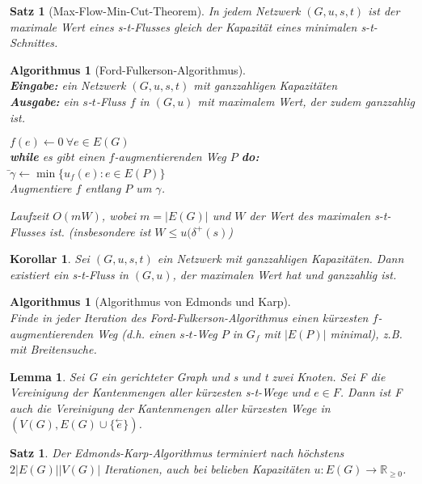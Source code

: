 \documentclass[12pt,a4paper]{article}
\theoremstyle{plain}
\newtheorem{Satz}[Theorem]{Satz}
\newtheorem{Lemma}[Theorem]{Lemma}
\newtheorem{Korollar}[Theorem]{Korollar}
\newtheorem{Algorithmus}[Theorem]{Algorithmus}
\newcommand{\R}{\mathbb{R}}
\numberwithin{equation}{section}
\begin{document}
\begin{Satz}[Max-Flow-Min-Cut-Theorem]
In jedem Netzwerk $(G,u,s,t)$ ist der maximale Wert eines s-t-Flusses gleich der Kapazität eines minimalen s-t-Schnittes.
\end{Satz}
\begin{Algorithmus}[Ford-Fulkerson-Algorithmus]\\
\textbf{Eingabe:} ein Netzwerk $(G,u,s,t)$ mit ganzzahligen Kapazitäten\\
\textbf{Ausgabe:} ein $s$-$t$-Fluss $f$ in $(G,u)$ mit maximalem Wert, der zudem ganzzahlig ist.
\begin{tabbing}
$f(e)\leftarrow 0\ \forall e\in E(G)$\\
\textbf{while} es gibt einen $f$-augmentierenden Weg $P$ \textbf{do:}\\
\text{\qquad}\=$\gamma\leftarrow \min\{u_f(e):e\in E(P)\}$\\
\>Augmentiere $f$ entlang $P$ um $\gamma$.
\end{tabbing}
Laufzeit $O(mW)$, wobei $m=|E(G)|$ und $W$ der Wert des maximalen s-t-Flusses ist. (insbesondere ist $W\leq u(\delta^+(s)$)
\end{Algorithmus}
\begin{Korollar}
Sei $(G,u,s,t)$ ein Netzwerk mit ganzzahligen Kapazitäten. Dann existiert ein s-t-Fluss in $(G,u)$, der maximalen Wert hat und ganzzahlig ist.
\end{Korollar}
\begin{Algorithmus}[Algorithmus von Edmonds und Karp]\\
Finde in jeder Iteration des Ford-Fulkerson-Algorithmus einen kürzesten $f$-augmentierenden Weg (d.h. einen $s$-$t$-Weg $P$ in $G_f$ mit $|E(P)|$ minimal), z.B. mit Breitensuche.
\end{Algorithmus}
\begin{Lemma}
Sei G ein gerichteter Graph und s und t zwei Knoten. Sei F die Vereinigung der Kantenmengen aller kürzesten s-t-Wege und $e\in F$. Dann ist F auch die Vereinigung der Kantenmengen aller kürzesten Wege in $(V(G), E(G)\cup \{\stackrel{\leftarrow}{e}\})$.
\end{Lemma}
\begin{Satz}
Der Edmonds-Karp-Algorithmus terminiert nach höchstens $2|E(G)||V(G)|$ Iterationen, auch bei belieben Kapazitäten $u: E(G)\rightarrow \R_{\geq 0}$.
\end{Satz}
\end{document}
